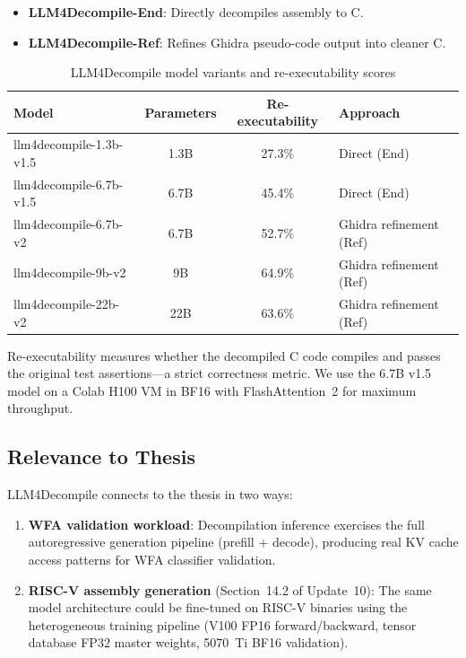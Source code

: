 \documentclass[11pt,letterpaper]{article}
\begin{document}
\begin{itemize}
    \item \textbf{LLM4Decompile-End}: Directly decompiles assembly to C.
    \item \textbf{LLM4Decompile-Ref}: Refines Ghidra pseudo-code output into cleaner C.
\end{itemize}

\begin{table}[htbp]
\centering
\caption{LLM4Decompile model variants and re-executability scores}
\label{tab:llm4decompile-models}
\begin{tabular}{@{}lccl@{}}
\toprule
\textbf{Model} & \textbf{Parameters} & \textbf{Re-executability} & \textbf{Approach} \\
\midrule
llm4decompile-1.3b-v1.5 & 1.3B & 27.3\% & Direct (End) \\
llm4decompile-6.7b-v1.5 & 6.7B & 45.4\% & Direct (End) \\
llm4decompile-6.7b-v2 & 6.7B & 52.7\% & Ghidra refinement (Ref) \\
llm4decompile-9b-v2 & 9B & 64.9\% & Ghidra refinement (Ref) \\
llm4decompile-22b-v2 & 22B & 63.6\% & Ghidra refinement (Ref) \\
\bottomrule
\end{tabular}
\end{table}

Re-executability measures whether the decompiled C code compiles and passes the original test assertions---a strict correctness metric. We use the 6.7B v1.5 model on a Colab H100 VM in BF16 with FlashAttention~2 for maximum throughput.

\subsection{Relevance to Thesis}

LLM4Decompile connects to the thesis in two ways:

\begin{enumerate}
    \item \textbf{WFA validation workload}: Decompilation inference exercises the full autoregressive generation pipeline (prefill + decode), producing real KV cache access patterns for WFA classifier validation.
    \item \textbf{RISC-V assembly generation} (Section~14.2 of Update~10): The same model architecture could be fine-tuned on RISC-V binaries using the heterogeneous training pipeline (V100 FP16 forward/backward, tensor database FP32 master weights, 5070~Ti BF16 validation).
\end{enumerate}
\end{document}
